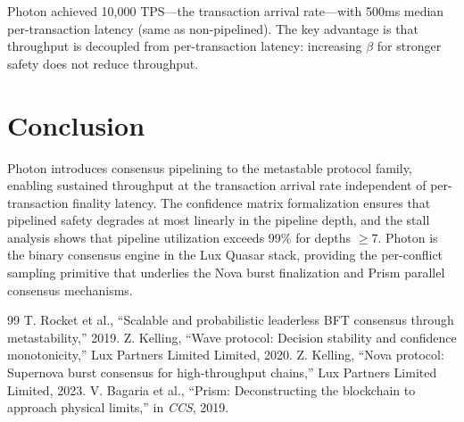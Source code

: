 \documentclass[11pt,a4paper]{article}
\begin{document}
Photon achieved 10,000 TPS---the transaction arrival rate---with 500ms median per-transaction
latency (same as non-pipelined). The key advantage is that throughput is decoupled from
per-transaction latency: increasing $\beta$ for stronger safety does not reduce throughput.

\section{Conclusion}
\label{sec:conclusion}

Photon introduces consensus pipelining to the metastable protocol family, enabling
sustained throughput at the transaction arrival rate independent of per-transaction
finality latency. The confidence matrix formalization ensures that pipelined safety
degrades at most linearly in the pipeline depth, and the stall analysis shows that
pipeline utilization exceeds 99\% for depths $\geq 7$. Photon is the binary consensus
engine in the Lux Quasar stack, providing the per-conflict sampling primitive that
underlies the Nova burst finalization and Prism parallel consensus mechanisms.

\begin{thebibliography}{99}
 T. Rocket et al., ``Scalable and probabilistic leaderless BFT consensus through metastability,'' 2019.
 Z. Kelling, ``Wave protocol: Decision stability and confidence monotonicity,'' Lux Partners Limited Limited, 2020.
 Z. Kelling, ``Nova protocol: Supernova burst consensus for high-throughput chains,'' Lux Partners Limited Limited, 2023.
 V. Bagaria et al., ``Prism: Deconstructing the blockchain to approach physical limits,'' in \emph{CCS}, 2019.
\end{thebibliography}
\end{document}
